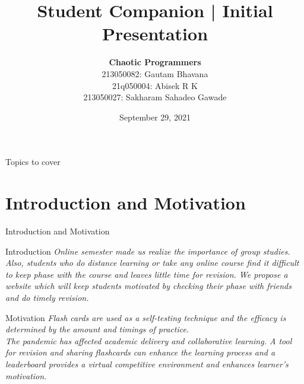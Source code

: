 \documentclass[10pt]{beamer}
\title{\textbf{Student Companion | Initial Presentation}}
\author{\textbf{Chaotic Programmers}     \\213050082: Gautam Bhavana\\
21q050004: Abisek R K\\
213050027: Sakharam Sahadeo Gawade\\}
\institute{IIT Bombay}
\date{September 29, 2021}
\begin{document}
{\maketitle}
\section[]{}
\begin{frame}{Topics to cover}
\tableofcontents
\end{frame}
\section{Introduction and Motivation}
\begin{frame}{Introduction and Motivation}
    \begin{block}{\large Introduction}
{\textit{Online semester made us realize the importance of group studies. Also, students who do distance learning or take any online course find it difficult to keep phase with the course and leaves little time for revision. We propose a website which will keep students motivated by checking their phase with friends and do timely revision.}}
\end{block}
\pause
\begin{block}{\large Motivation}
{\textit{Flash cards are used  as a self-testing technique and the efficacy is determined by the amount and timings of practice. \cite{flashcard} \\The pandemic has affected academic delivery and collaborative learning. A tool for revision and sharing flashcards can enhance the learning process and a leaderboard provides a virtual competitive environment and enhances learner's motivation.\cite{leaderboard}}}
\end{block}
\end{frame}
\end{document}
